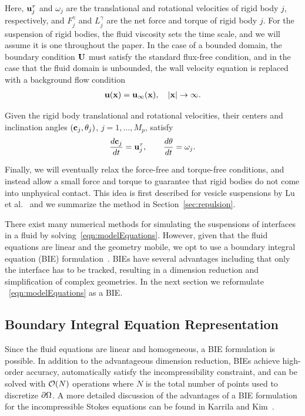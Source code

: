 \documentclass[preprint, 10pt]{elsarticle}
\begin{document}
Here, ${\mathbf{u}}^\tau_j$ and $\omega_j$ are the translational and rotational
velocities of rigid body $j$, respectively, and $F_j^\gamma$ and
$L_j^\gamma$ are the net force and torque of rigid body $j$.  For the
suspension of rigid bodies, the fluid viscosity sets the time scale, and
we will assume it is one throughout the paper.  In the case of a bounded
domain, the boundary condition ${\mathbf{U}}$ must satisfy the standard flux-free
condition, and in the case that the fluid domain is unbounded, the wall
velocity equation is replaced with a background flow condition
\begin{align*}
  {\mathbf{u}}({\mathbf{x}}) = {\mathbf{u}}_\infty({\mathbf{x}}), \quad |{\mathbf{x}}| \rightarrow \infty.
\end{align*}

Given the
rigid body translational and rotational velocities, their centers and
inclination angles $({\mathbf{c}}_j,\theta_j)$, $j=1,\ldots,M_p$, satisfy
\begin{align*}
  \frac{d{\mathbf{c}}_j}{dt} = {\mathbf{u}}^\tau_j, \qquad 
  \frac{d\theta}{dt} = \omega_j.
\end{align*}

Finally, we will eventually relax the force-free and torque-free conditions,
and instead allow a small force and torque to guarantee that rigid
bodies do not come into unphysical contact.  This idea is first
described for vesicle suspensions by Lu et al.~\cite{Lu2017} and we
summarize the method in Section~\ref{sec:repulsion}.  



There exist many numerical methods for simulating the suspensions of
interfaces in a fluid by solving~\eqref{eqn:modelEquations}.  However,
given that the fluid equations are linear and the geometry mobile, we opt to use a boundary
integral equation (BIE) formulation~\cite{Pozrikidis1992}.  BIEs have
several advantages including that only the interface has to be tracked,
resulting in a dimension reduction and simplification of complex
geometries.  In the next section we reformulate ~\eqref{eqn:modelEquations} as a BIE.

\subsection{Boundary Integral Equation Representation}
Since the fluid equations are linear and homogeneous, a BIE formulation
is possible.  In addition to the advantageous dimension reduction, BIEs
achieve high-order accuracy, automatically satisfy the incompressibility
constraint, and can be solved with ${\mathcal{O}}(N)$ operations where $N$ is
the total number of points used to discretize ${\partial}\Omega$.  A more
detailed discussion of the advantages of a BIE formulation for the
incompressible Stokes equations can be found in Karrila and
Kim~\cite{Karrila1989}.
\end{document}
